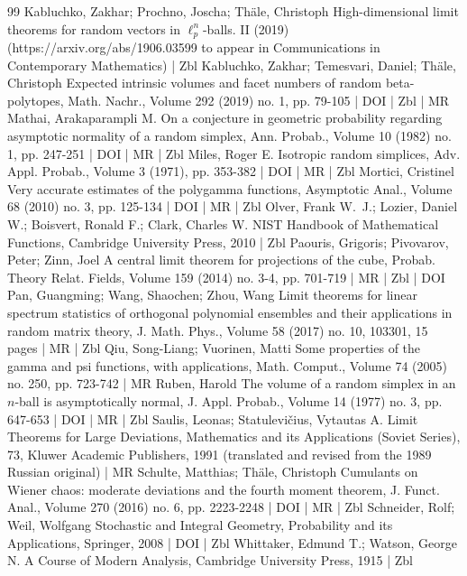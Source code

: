 \begin{thebibliography}{99}
Kabluchko, Zakhar; Prochno, Joscha; Thäle, Christoph High-dimensional limit theorems for random vectors in $\ell _p^n$-balls. II (2019) (https://arxiv.org/abs/1906.03599 to appear in Communications in Contemporary Mathematics) | Zbl
Kabluchko, Zakhar; Temesvari, Daniel; Thäle, Christoph Expected intrinsic volumes and facet numbers of random beta-polytopes, Math. Nachr., Volume 292 (2019) no. 1, pp. 79-105 | DOI | Zbl | MR
Mathai, Arakaparampli M. On a conjecture in geometric probability regarding asymptotic normality of a random simplex, Ann. Probab., Volume 10 (1982) no. 1, pp. 247-251 | DOI | MR | Zbl
Miles, Roger E. Isotropic random simplices, Adv. Appl. Probab., Volume 3 (1971), pp. 353-382 | DOI | MR | Zbl
Mortici, Cristinel Very accurate estimates of the polygamma functions, Asymptotic Anal., Volume 68 (2010) no. 3, pp. 125-134 | DOI | MR | Zbl
Olver, Frank W. J.; Lozier, Daniel W.; Boisvert, Ronald F.; Clark, Charles W. NIST Handbook of Mathematical Functions, Cambridge University Press, 2010 | Zbl
Paouris, Grigoris; Pivovarov, Peter; Zinn, Joel A central limit theorem for projections of the cube, Probab. Theory Relat. Fields, Volume 159 (2014) no. 3-4, pp. 701-719 | MR | Zbl | DOI
Pan, Guangming; Wang, Shaochen; Zhou, Wang Limit theorems for linear spectrum statistics of orthogonal polynomial ensembles and their applications in random matrix theory, J. Math. Phys., Volume 58 (2017) no. 10, 103301, 15 pages | MR | Zbl
Qiu, Song-Liang; Vuorinen, Matti Some properties of the gamma and psi functions, with applications, Math. Comput., Volume 74 (2005) no. 250, pp. 723-742 | MR
Ruben, Harold The volume of a random simplex in an $n$-ball is asymptotically normal, J. Appl. Probab., Volume 14 (1977) no. 3, pp. 647-653 | DOI | MR | Zbl
Saulis, Leonas; Statulevičius, Vytautas A. Limit Theorems for Large Deviations, Mathematics and its Applications (Soviet Series), 73, Kluwer Academic Publishers, 1991 (translated and revised from the 1989 Russian original) | MR
Schulte, Matthias; Thäle, Christoph Cumulants on Wiener chaos: moderate deviations and the fourth moment theorem, J. Funct. Anal., Volume 270 (2016) no. 6, pp. 2223-2248 | DOI | MR | Zbl
Schneider, Rolf; Weil, Wolfgang Stochastic and Integral Geometry, Probability and its Applications, Springer, 2008 | DOI | Zbl
Whittaker, Edmund T.; Watson, George N. A Course of Modern Analysis, Cambridge University Press, 1915 | Zbl
\end{thebibliography}
